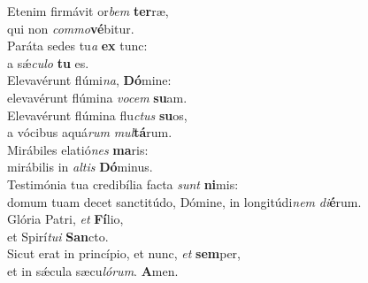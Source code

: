 \evenverse Etenim firmávit or\textit{bem} \textbf{ter}ræ,~\*\\
\evenverse qui non \textit{com}\textit{mo}\textbf{vé}bitur.\\
\oddverse Paráta sedes tu\textit{a} \textbf{ex} tunc:~\*\\
\oddverse a sǽ\textit{cu}\textit{lo} \textbf{tu} es.\\
\evenverse Elevavérunt flúmi\textit{na}, \textbf{Dó}mine:~\*\\
\evenverse elevavérunt flúmina \textit{vo}\textit{cem} \textbf{su}am.\\
\oddverse Elevavérunt flúmina flu\textit{ctus} \textbf{su}os,~\*\\
\oddverse a vócibus aquá\textit{rum} \textit{mul}\textbf{tá}rum.\\
\evenverse Mirábiles elatió\textit{nes} \textbf{ma}ris:~\*\\
\evenverse mirábilis in \textit{al}\textit{tis} \textbf{Dó}minus.\\
\oddverse Testimónia tua credibília facta \textit{sunt} \textbf{ni}mis:~\*\\
\oddverse domum tuam decet sanctitúdo, Dómine, in longitúdi\textit{nem} \textit{di}\textbf{é}rum.\\
\evenverse Glória Patri, \textit{et} \textbf{Fí}lio,~\*\\
\evenverse et Spirí\textit{tu}\textit{i} \textbf{San}cto.\\
\oddverse Sicut erat in princípio, et nunc, \textit{et} \textbf{sem}per,~\*\\
\oddverse et in sǽcula sæcu\textit{ló}\textit{rum}. \textbf{A}men.\\
